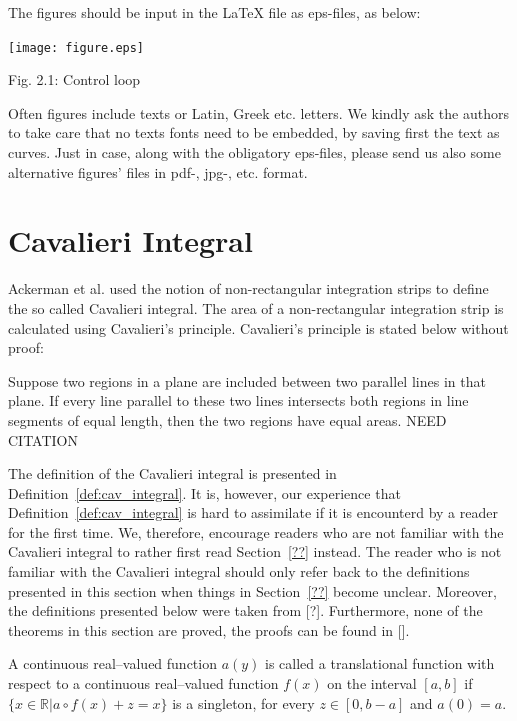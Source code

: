 \documentclass[twoside,reqno,11pt]{fcaa-var} %
\begin{document}
The figures should be input in the LaTeX file as eps-files, as below:

  \begin{center}
  \texttt{[image: figure.eps]}

 \bigskip

  Fig. 2.1: Control loop
  \end{center}

 Often figures include texts or Latin, Greek etc. letters.
 We kindly ask the authors to take care that no texts fonts need to be embedded, by saving first the text as curves.
 Just in case, along with the obligatory eps-files, please send us also some alternative figures' files in  pdf-, jpg-, etc. format.

\section{Cavalieri Integral}
\label{sec:cav_integral}

Ackerman et al. used the notion of non-rectangular integration strips to define the so called Cavalieri integral. The area of a non-rectangular 
integration strip is calculated using Cavalieri's principle. Cavalieri's principle is stated below without proof:
\begin{theorem}
Suppose two regions in a plane are included between two parallel lines in that plane. If every line parallel to these
two lines intersects both regions in line segments of equal length, then the two regions have equal areas. NEED CITATION
\end{theorem}
The definition of the Cavalieri integral is presented in Definition~\ref{def:cav_integral}.
It is, however, our experience that Definition~\ref{def:cav_integral} is hard to assimilate if it is encounterd by a reader for the first time. We, therefore, encourage 
readers who are not familiar with the Cavalieri integral to rather first read Section~\ref{??} instead. The reader who is not familiar with the Cavalieri integral should only refer back to the definitions 
presented in this section when things in Section~\ref{??} become unclear. Moreover, the definitions presented below were taken from [?]. Furthermore, none of the theorems in this section are proved, the proofs can be found in [].

\begin{definition}\label{def:trans}
A continuous real--valued function $a(y)$ is called a translational function with respect to a continuous real--valued function $f(x)$ on the interval $[a,b]$ if 
$\{x\in\mathbb{R}|a\circ f(x) + z = x\}$ is a singleton, for every $z\in[0,b-a]$ and $a(0) = a$.
\end{definition}
\end{document}
